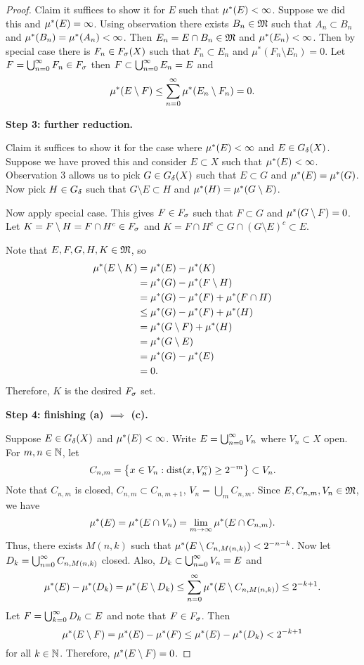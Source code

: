 \documentclass[a4paper]{article}
\begin{document}
\begin{proof}
Claim it suffices to show it for $E$ such that $\mu^*(E) < \infty$.
Suppose we did this and $\mu^*(E) = \infty$. Using observation
there exists $B_n \in \mathfrak{M}$ such that $A_n \subset B_n$
and $\mu^*(B_n) = \mu^* (A_n) < \infty$. Then $E_n = E \cap B_n 
\in \mathfrak{M}$ and $\mu^*(E_n) < \infty$. Then by special case there 
is $F_n \in F_\sigma(X)$ such that $F_n \subset E_n$ and 
$\mu^*(F_n \setminus E_n) = 0$. Let $F = \bigcup_{n=0}^\infty F_n \in F_\sigma$
then $F \subset \bigcup_{n=0}^\infty E_n = E$ and 
\[
\mu^*(E \setminus F) \leq \sum_{n=0}^\infty \mu^* (E_n \setminus F_n) = 0.
\]

\textbf{Step 3: further reduction.}

Claim it suffices to show it for the case where $\mu^*(E) < \infty$
and $E \in G_\delta(X)$. Suppose we have proved this and consider
$E \subset X$ such that $\mu^*(E) < \infty$. Observation 3 
allows us to pick $G \in G_\delta(X)$ such that $E \subset G$
and $\mu^*(E) = \mu^*(G)$. Now pick $H \in G_\delta$ such that $G \setminus E \subset H$
and $\mu^*(H) = \mu^*(G \setminus E)$. 

Now apply special case. This gives $F \in F_\sigma$ such that 
$F \subset G$ and $\mu^*(G \setminus F) = 0$. Let $K = F \setminus H
= F \cap H^c \in F_\sigma$ and $K = F \cap H^c \subset 
G \cap (G \setminus E)^c \subset E$.

Note that $E, F, G, H, K \in \mathfrak{M}$, so 
\[
\begin{aligned}
\mu^*(E \setminus K) 
&= \mu^*(E) - \mu^*(K) \\ 
&= \mu^*(G) - \mu^*(F \setminus H) \\ 
&= \mu^*(G) - \mu^*(F) + \mu^*(F \cap H) \\
&\leq \mu^*(G) - \mu^*(F) + \mu^*(H) \\
&= \mu^*(G \setminus F) + \mu^*(H)  \\
&= \mu^*(G \setminus E) \\
&= \mu^*(G) - \mu^*(E) \\
&= 0.
\end{aligned}
\]
Therefore, $K$ is the desired $F_\sigma$ set.

\textbf{Step 4: finishing (a) $\implies$ (c). }

Suppose $E \in G_\delta(X)$ and $\mu^*(E) < \infty$. 
Write $E = \bigcup_{n=0}^\infty V_n$ where $V_n \subset X$ open.
For $m, n \in \mathbb{N}$, let 
\[
C_{n, m} = \left\{ x \in V_n: \operatorname{dist}(x, V_n^c) \geq 2^{-m} \right\} 
\subset V_n. 
\]
Note that $C_{n, m}$ is closed, $C_{n, m} \subset C_{n, m+1}$,
$V_n = \bigcup_{m} C_{n, m}$. Since $E, C_{n, m}, V_n \in \mathfrak{M}$,
we have 
\[
\mu^*(E) = \mu^*(E \cap V_n) = \lim_{m \to \infty} \mu^*(E 
\cap C_{n, m}).
\]
Thus, there exists $M(n, k)$ such that 
$\mu^*(E \setminus C_{n, M(n, k)}) < 2^{-n-k}$.
Now let $D_k = \bigcup_{n=0}^\infty C_{n, M(n, k)}$ closed. 
Also, $D_k \subset \bigcup_{n=0}^\infty V_n = E$ and 
\[
\mu^*(E) - \mu^*(D_k) = \mu^*(E \setminus D_k) 
\leq \sum_{n=0}^\infty \mu^*(E \setminus C_{n, M(n, k)}) \leq 2^{-k+1}.
\]
Let $F = \bigcup_{k=0}^\infty D_k \subset E$ and note that $F \in F_\sigma$.
Then 
\[
\mu^*(E \setminus F) = \mu^*(E) - \mu^*(F) 
\leq \mu^*(E) - \mu^*(D_k) < 2^{-k+1}
\]
for all $k \in \mathbb{N}$. Therefore, $\mu^*(E \setminus F) = 0$.


\end{proof}
\end{document}
